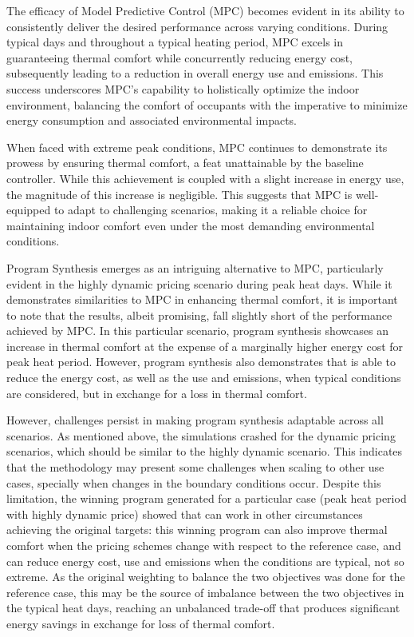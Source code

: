 The efficacy of Model Predictive Control (MPC) becomes evident in its ability to consistently deliver the desired performance across varying conditions. During typical days and throughout a typical heating period, MPC excels in guaranteeing thermal comfort while concurrently reducing energy cost, subsequently leading to a reduction in overall energy use and emissions. This success underscores MPC's capability to holistically optimize the indoor environment, balancing the comfort of occupants with the imperative to minimize energy consumption and associated environmental impacts.

When faced with extreme peak conditions, MPC continues to demonstrate its prowess by ensuring thermal comfort, a feat unattainable by the baseline controller. While this achievement is coupled with a slight increase in energy use, the magnitude of this increase is negligible. This suggests that MPC is well-equipped to adapt to challenging scenarios, making it a reliable choice for maintaining indoor comfort even under the most demanding environmental conditions.

Program Synthesis emerges as an intriguing alternative to MPC, particularly evident in the highly dynamic pricing scenario during peak heat days. While it demonstrates similarities to MPC in enhancing thermal comfort, it is important to note that the results, albeit promising, fall slightly short of the performance achieved by MPC. In this particular scenario, program synthesis showcases an increase in thermal comfort at the expense of a marginally higher energy cost for peak heat period. However, program synthesis also demonstrates that is able to reduce the energy cost, as well as the use and emissions, when typical conditions are considered, but in exchange for a loss in thermal comfort. 

However, challenges persist in making program synthesis adaptable across all scenarios. As mentioned above, the simulations crashed for the dynamic pricing scenarios, which should be similar to the highly dynamic scenario. This indicates that the methodology may present some challenges when scaling to other use cases, specially when changes in the boundary conditions occur. Despite this limitation, the winning program generated for a particular case (peak heat period with highly dynamic price) showed that can work in other circumstances achieving the original targets: this winning program can also improve thermal comfort when the pricing schemes change with respect to the reference case, and can reduce energy cost, use and emissions when the conditions are typical, not so extreme. As the original weighting to balance the two objectives was done for the reference case, this may be the source of imbalance between the two objectives in the typical heat days, reaching an unbalanced trade-off that produces significant energy savings in exchange for loss of thermal comfort.

